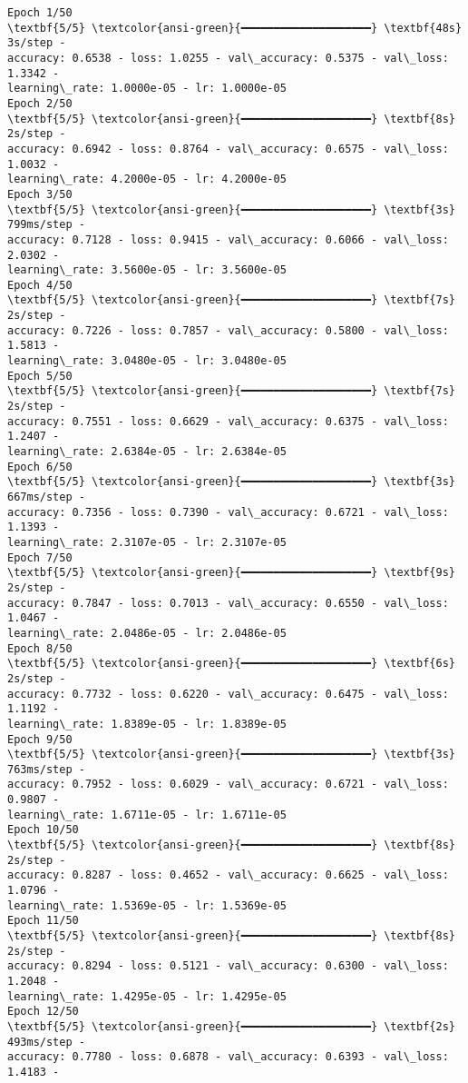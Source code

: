 \documentclass[11pt]{article}
\begin{document}
    \begin{Verbatim}[commandchars=\\\{\}]
Epoch 1/50
\textbf{5/5} \textcolor{ansi-green}{━━━━━━━━━━━━━━━━━━━━} \textbf{48s} 3s/step -
accuracy: 0.6538 - loss: 1.0255 - val\_accuracy: 0.5375 - val\_loss: 1.3342 -
learning\_rate: 1.0000e-05 - lr: 1.0000e-05
Epoch 2/50
\textbf{5/5} \textcolor{ansi-green}{━━━━━━━━━━━━━━━━━━━━} \textbf{8s} 2s/step -
accuracy: 0.6942 - loss: 0.8764 - val\_accuracy: 0.6575 - val\_loss: 1.0032 -
learning\_rate: 4.2000e-05 - lr: 4.2000e-05
Epoch 3/50
\textbf{5/5} \textcolor{ansi-green}{━━━━━━━━━━━━━━━━━━━━} \textbf{3s} 799ms/step -
accuracy: 0.7128 - loss: 0.9415 - val\_accuracy: 0.6066 - val\_loss: 2.0302 -
learning\_rate: 3.5600e-05 - lr: 3.5600e-05
Epoch 4/50
\textbf{5/5} \textcolor{ansi-green}{━━━━━━━━━━━━━━━━━━━━} \textbf{7s} 2s/step -
accuracy: 0.7226 - loss: 0.7857 - val\_accuracy: 0.5800 - val\_loss: 1.5813 -
learning\_rate: 3.0480e-05 - lr: 3.0480e-05
Epoch 5/50
\textbf{5/5} \textcolor{ansi-green}{━━━━━━━━━━━━━━━━━━━━} \textbf{7s} 2s/step -
accuracy: 0.7551 - loss: 0.6629 - val\_accuracy: 0.6375 - val\_loss: 1.2407 -
learning\_rate: 2.6384e-05 - lr: 2.6384e-05
Epoch 6/50
\textbf{5/5} \textcolor{ansi-green}{━━━━━━━━━━━━━━━━━━━━} \textbf{3s} 667ms/step -
accuracy: 0.7356 - loss: 0.7390 - val\_accuracy: 0.6721 - val\_loss: 1.1393 -
learning\_rate: 2.3107e-05 - lr: 2.3107e-05
Epoch 7/50
\textbf{5/5} \textcolor{ansi-green}{━━━━━━━━━━━━━━━━━━━━} \textbf{9s} 2s/step -
accuracy: 0.7847 - loss: 0.7013 - val\_accuracy: 0.6550 - val\_loss: 1.0467 -
learning\_rate: 2.0486e-05 - lr: 2.0486e-05
Epoch 8/50
\textbf{5/5} \textcolor{ansi-green}{━━━━━━━━━━━━━━━━━━━━} \textbf{6s} 2s/step -
accuracy: 0.7732 - loss: 0.6220 - val\_accuracy: 0.6475 - val\_loss: 1.1192 -
learning\_rate: 1.8389e-05 - lr: 1.8389e-05
Epoch 9/50
\textbf{5/5} \textcolor{ansi-green}{━━━━━━━━━━━━━━━━━━━━} \textbf{3s} 763ms/step -
accuracy: 0.7952 - loss: 0.6029 - val\_accuracy: 0.6721 - val\_loss: 0.9807 -
learning\_rate: 1.6711e-05 - lr: 1.6711e-05
Epoch 10/50
\textbf{5/5} \textcolor{ansi-green}{━━━━━━━━━━━━━━━━━━━━} \textbf{8s} 2s/step -
accuracy: 0.8287 - loss: 0.4652 - val\_accuracy: 0.6625 - val\_loss: 1.0796 -
learning\_rate: 1.5369e-05 - lr: 1.5369e-05
Epoch 11/50
\textbf{5/5} \textcolor{ansi-green}{━━━━━━━━━━━━━━━━━━━━} \textbf{8s} 2s/step -
accuracy: 0.8294 - loss: 0.5121 - val\_accuracy: 0.6300 - val\_loss: 1.2048 -
learning\_rate: 1.4295e-05 - lr: 1.4295e-05
Epoch 12/50
\textbf{5/5} \textcolor{ansi-green}{━━━━━━━━━━━━━━━━━━━━} \textbf{2s} 493ms/step -
accuracy: 0.7780 - loss: 0.6878 - val\_accuracy: 0.6393 - val\_loss: 1.4183 -

\end{Verbatim}
\end{document}
